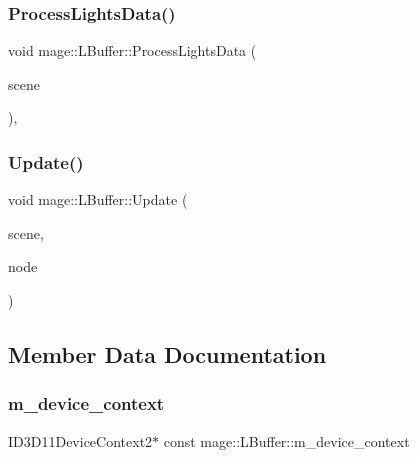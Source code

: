 \subsubsection{\texorpdfstring{Process\+Lights\+Data()}{ProcessLightsData()}}
{\footnotesize\ttfamily void mage\+::\+L\+Buffer\+::\+Process\+Lights\+Data (\begin{DoxyParamCaption}\item[{const \hyperlink{structmage_1_1_pass_buffer}{Pass\+Buffer} $\ast$}]{scene }\end{DoxyParamCaption})\hspace{0.3cm}{\ttfamily [private]}, {\ttfamily [noexcept]}}

\hypertarget{structmage_1_1_l_buffer_a5584d77b6d99bfc0dfe7ac57734a105b}{}\label{structmage_1_1_l_buffer_a5584d77b6d99bfc0dfe7ac57734a105b} 
\subsubsection{\texorpdfstring{Update()}{Update()}}
{\footnotesize\ttfamily void mage\+::\+L\+Buffer\+::\+Update (\begin{DoxyParamCaption}\item[{const \hyperlink{structmage_1_1_pass_buffer}{Pass\+Buffer} $\ast$}]{scene,  }\item[{const \hyperlink{classmage_1_1_camera_node}{Camera\+Node} $\ast$}]{node }\end{DoxyParamCaption})}



\subsection{Member Data Documentation}
\hypertarget{structmage_1_1_l_buffer_a51538e4167fe078e96ab4d0c17d08ace}{}\label{structmage_1_1_l_buffer_a51538e4167fe078e96ab4d0c17d08ace} 
\subsubsection{\texorpdfstring{m\+\_\+device\+\_\+context}{m\_device\_context}}
{\footnotesize\ttfamily I\+D3\+D11\+Device\+Context2$\ast$ const mage\+::\+L\+Buffer\+::m\+\_\+device\+\_\+context\hspace{0.3cm}{\ttfamily [private]}}

